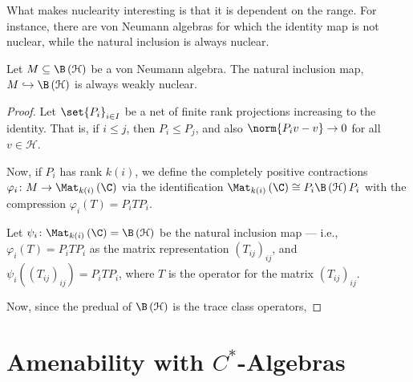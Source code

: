 \documentclass[10pt]{mypackage}
\begin{document}
What makes nuclearity interesting is that it is dependent on the range. For instance, there are von Neumann algebras for which the identity map is not nuclear, while the natural inclusion is always nuclear.
\begin{proposition}
  Let $M\subseteq \B\left( \mathcal{H} \right)$ be a von Neumann algebra. The natural inclusion map, $M\hookrightarrow \B\left( \mathcal{H} \right)$ is always weakly nuclear.
\end{proposition}
\begin{proof}
  Let $\set{P_i}_{i\in I}$ be a net of finite rank projections increasing to the identity. That is, if $i\leq j$, then $P_i\leq P_j$, and also $\norm{P_iv - v}\rightarrow 0$ for all $v\in \mathcal{H}$.\newline

  Now, if $P_i$ has rank $k(i)$, we define the completely positive contractions $\varphi_i\colon M\rightarrow \Mat_{k(i)}\left( \C \right)$ via the identification $\Mat_{k(i)}\left( \C \right) \cong P_i\B\left( \mathcal{H} \right)P_i$ with the compression $\varphi_i(T) = P_iTP_i$.\newline

  Let $\psi_i\colon \Mat_{k(i)}\left( \C \right) = \B\left( \mathcal{H} \right)$ be the natural inclusion map --- i.e., $\varphi_i(T) = P_iTP_i$ as the matrix representation $\left( T_{ij} \right)_{ij}$, and $\psi_i\left( \left( T_{ij} \right)_{ij} \right) = P_iTP_i$, where $T$ is the operator for the matrix $\left( T_{ij} \right)_{ij}$.\newline

  Now, since the predual of $\B\left( \mathcal{H} \right)$ is the trace class operators,
\end{proof}

\section{Amenability with \texorpdfstring{$C^{\ast}$-Algebras}{C*-Algebras}}%
\end{document}
